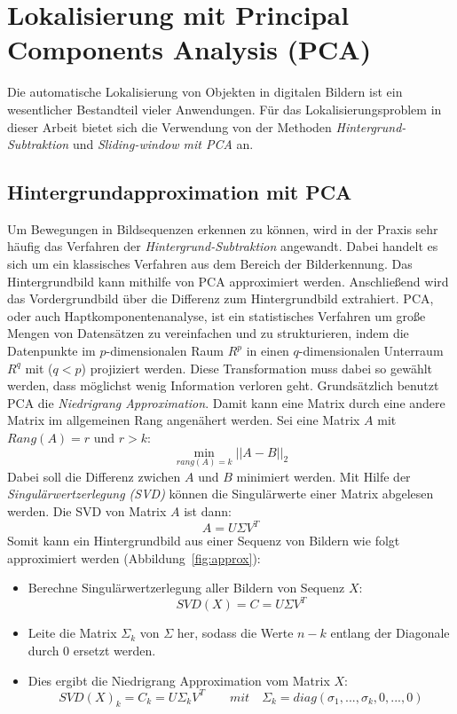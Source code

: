 \newpage
\section{ Lokalisierung mit Principal Components Analysis (PCA)}
Die automatische Lokalisierung von Objekten in digitalen Bildern ist ein wesentlicher Bestandteil vieler Anwendungen. 
Für das Lokalisierungsproblem in dieser Arbeit bietet sich die Verwendung von der Methoden \textit{Hintergrund-Subtraktion} und \textit{Sliding-window mit PCA} an.

\subsection{Hintergrundapproximation mit PCA}
Um Bewegungen in Bildsequenzen erkennen zu können, wird in der Praxis sehr häufig das Verfahren der \textit{Hintergrund-Subtraktion} angewandt. Dabei handelt es sich um ein klassisches Verfahren aus dem Bereich der Bilderkennung. Das Hintergrundbild kann mithilfe von PCA approximiert werden. Anschließend wird das Vordergrundbild über die Differenz zum Hintergrundbild extrahiert. PCA, oder auch Haptkomponentenanalyse, ist ein statistisches Verfahren um große Mengen von Datensätzen zu vereinfachen und zu strukturieren, indem die Datenpunkte im $p$-dimensionalen Raum $R^p$ in einen $q$-dimensionalen Unterraum ${R} ^{q}$ mit ($q<p$) projiziert werden. Diese Transformation muss dabei so gewählt werden, dass möglichst wenig Information verloren geht. 
Grundsätzlich benutzt PCA die \textit{Niedrigrang Approximation}. Damit kann eine Matrix durch eine andere Matrix im allgemeinen Rang angenähert werden. Sei eine Matrix $A$ mit $Rang(A) = r$ und $r > k$:
\begin{equation}
\min_{rang(A)=k}||A-B||_2 
\end{equation}
Dabei soll die Differenz zwichen $A$ und $B$ minimiert werden. Mit Hilfe der \textit{Singulärwertzerlegung (SVD)} können die Singulärwerte einer Matrix abgelesen werden. Die SVD von Matrix $A$ ist dann:
\begin{equation}
A = U \Sigma V^T
\end{equation}
Somit kann ein Hintergrundbild aus einer Sequenz von Bildern wie folgt approximiert werden (Abbildung~\ref{fig:approx}):
\begin{itemize}
\item{Berechne Singulärwertzerlegung aller Bildern von Sequenz $X$:}
\begin{equation}
SVD(X)= C = U \Sigma V^T
\end{equation}
\item{Leite die Matrix ${\Sigma_k}$ von ${\Sigma}$ her, sodass die Werte ${n - k}$  entlang der Diagonale durch 0 ersetzt werden.}
\item{Dies ergibt die Niedrigrang Approximation vom Matrix $X$:}
\begin{equation}
SVD(X)_k=C_k = U\Sigma_kV^T \quad\quad mit  \quad  \Sigma_k = diag(\sigma_1, ..., \sigma_k,0,...,0)
\end{equation}
\end{itemize}
